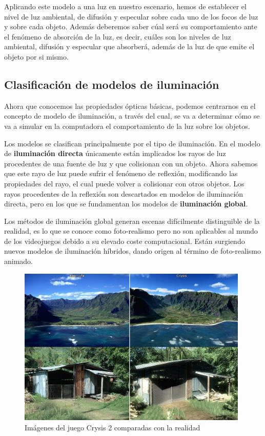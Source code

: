Aplicando este modelo a una luz en nuestro escenario, hemos de establecer el nivel de luz ambiental, de difusión y especular sobre cada uno de los focos de luz y sobre cada objeto. Además deberemos saber cúal será su comportamiento ante el fenómeno de absorción de la luz, es decir, cuáles son los niveles de luz ambiental, difusión y especular que absorberá, además de la luz de que emite el objeto por si mismo. 

\subsection{Clasificación de modelos de iluminación}

Ahora que conocemos las propiedades ópticas básicas, podemos centrarnos en el concepto de modelo de iluminación, a través del cual, se va a determinar cómo se va a simular en la computadora el comportamiento de la luz sobre los objetos. 
\newline 

Los modelos se clasifican principalmente por el tipo de iluminación. En el modelo de \textbf{iluminación directa} únicamente están implicados los rayos de luz procedentes de una fuente de luz y que colisionan con un objeto. Ahora sabemos que este rayo de luz puede sufrir el fenómeno de reflexión, modificando las propiedades del rayo, el cual puede volver a colisionar con otros objetos. Los rayos procedentes de la reflexión son descartados en modelos de iluminación directa, pero en los que se fundamentan los modelos de \textbf{iluminación global}.
\newline

Los métodos de iluminación global generan escenas difícilmente distinguible de la realidad, es lo que se conoce como foto-realismo pero no son aplicables al mundo de los videojuegos debido a su elevado coste computacional. Están surgiendo nuevos modelos de iluminación híbridos, dando origen al término de  foto-realismo animado. 

\begin{figure}[h]
	\centering
	          \includegraphics[width=11cm]{img/fotorealismo.jpg}
	\caption{Imágenes del juego Crysis 2 comparadas con la realidad}
\end{figure}

